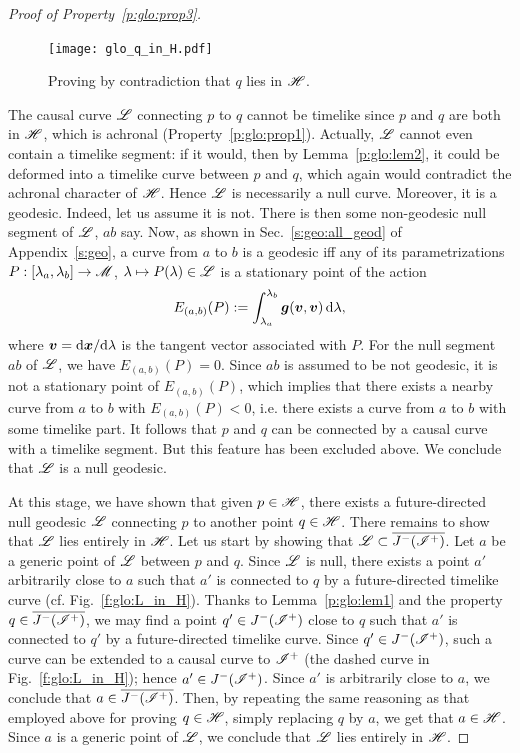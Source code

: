 \begin{proof}[Proof of Property~\ref{p:glo:prop3}]
\begin{figure}
\centerline{\texttt{[image: glo\_q\_in\_H.pdf]}}
\caption[]{\label{f:glo:q_in_H} \footnotesize
Proving by contradiction that $q$ lies in $\mathscr{H}$.}
\end{figure}


The causal curve $\mathscr{L}$ connecting $p$ to $q$ cannot be timelike since
$p$ and $q$ are both in $\mathscr{H}$, which is achronal (Property~\ref{p:glo:prop1}).
Actually, $\mathscr{L}$ cannot even contain a timelike segment: if it would, then
by Lemma~\ref{p:glo:lem2}, it could
be deformed into a timelike curve between $p$ and $q$, which again would
contradict the achronal character of $\mathscr{H}$. Hence $\mathscr{L}$ is necessarily a null
curve. Moreover, it is a geodesic. Indeed, let us assume it is not.
There is then some non-geodesic null segment of $\mathscr{L}$, $ab$ say. Now, as shown in Sec.~\ref{s:geo:all_geod} of Appendix~\ref{s:geo},
a curve from $a$ to $b$ is a geodesic iff any of its parametrizations
$P: [\lambda_a,\lambda_b] \rightarrow \mathscr{M}$, $\lambda \mapsto P(\lambda)\in\mathscr{L}$
is a stationary point of the action
\[
    E_{(a,b)}(P) := \int_{\lambda_a}^{\lambda_b}
        \bm{g}(\bm{v}, \bm{v})  \, \mathrm{d}\lambda ,
\]
where $\bm{v} = \mathrm{d}\bm{x}/\mathrm{d}\lambda$ is the tangent vector
associated with $P$. For the null segment $ab$ of $\mathscr{L}$, we have
$E_{(a,b)}(P)=0$. Since $ab$ is assumed to be not geodesic, it is not a
stationary point of $E_{(a,b)}(P)$, which
implies that there exists a nearby curve from $a$ to $b$ with $E_{(a,b)}(P)<0$,
i.e. there exists a curve from $a$ to $b$ with some timelike part.
It follows that $p$ and $q$ can be connected
by a causal curve with a timelike segment. But this feature has been
excluded above. We conclude that $\mathscr{L}$ is a null geodesic.

At this stage, we have shown that given $p\in\mathscr{H}$, there exists
a future-directed null geodesic $\mathscr{L}$ connecting $p$ to another point $q\in\mathscr{H}$.
There remains to show that $\mathscr{L}$ lies entirely in $\mathscr{H}$.
Let us start by showing that $\mathscr{L}\subset \overline{J^-(\mathscr{I}^+)}$.
Let $a$ be a generic point of $\mathscr{L}$ between $p$ and $q$. Since $\mathscr{L}$ is
null, there exists a point
$a'$ arbitrarily close to $a$ such that $a'$ is connected to $q$ by a
future-directed timelike curve (cf. Fig.~\ref{f:glo:L_in_H}). Thanks to Lemma~\ref{p:glo:lem1}
and the property $q\in \overline{J^-(\mathscr{I}^+)}$, we may
find a point $q'\in J^-(\mathscr{I}^+)$ close to $q$ such that $a'$ is connected
to $q'$ by a future-directed timelike curve.
Since $q'\in J^-(\mathscr{I}^+)$, such a curve can be extended
to a causal curve to $\mathscr{I}^+$  (the dashed curve
in Fig.~\ref{f:glo:L_in_H}); hence
$a'\in  J^-(\mathscr{I}^+)$. Since $a'$ is arbitrarily close to $a$, we conclude
that $a\in\overline{J^-(\mathscr{I}^+)}$.
Then, by repeating the same reasoning as that employed above for proving
$q\in\mathscr{H}$, simply replacing $q$ by $a$, we get that $a\in\mathscr{H}$. Since
$a$ is a generic point of $\mathscr{L}$, we conclude that
$\mathscr{L}$ lies entirely in $\mathscr{H}$.


\end{proof}

